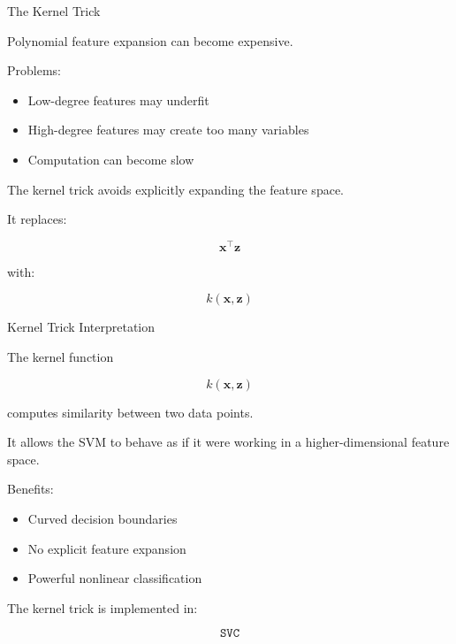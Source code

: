 \documentclass[aspectratio=169]{beamer}
\begin{document}

\begin{frame}{The Kernel Trick}

Polynomial feature expansion can become expensive.

\vspace{0.5em}

Problems:
\begin{itemize}
\item Low-degree features may underfit
\item High-degree features may create too many variables
\item Computation can become slow
\end{itemize}

\vspace{0.5em}

The kernel trick avoids explicitly expanding the feature space.

\vspace{0.5em}

It replaces:

\[
\mathbf{x}^{\top}\mathbf{z}
\]

with:

\[
k(\mathbf{x},\mathbf{z})
\]

\end{frame}


\begin{frame}{Kernel Trick Interpretation}

The kernel function

\[
k(\mathbf{x},\mathbf{z})
\]

computes similarity between two data points.

\vspace{0.5em}

It allows the SVM to behave as if it were working in a higher-dimensional feature space.

\vspace{0.5em}

Benefits:

\begin{itemize}
\item Curved decision boundaries
\item No explicit feature expansion
\item Powerful nonlinear classification
\end{itemize}

\vspace{0.5em}

The kernel trick is implemented in:

\[
\texttt{SVC}
\]

\end{frame}
\end{document}
